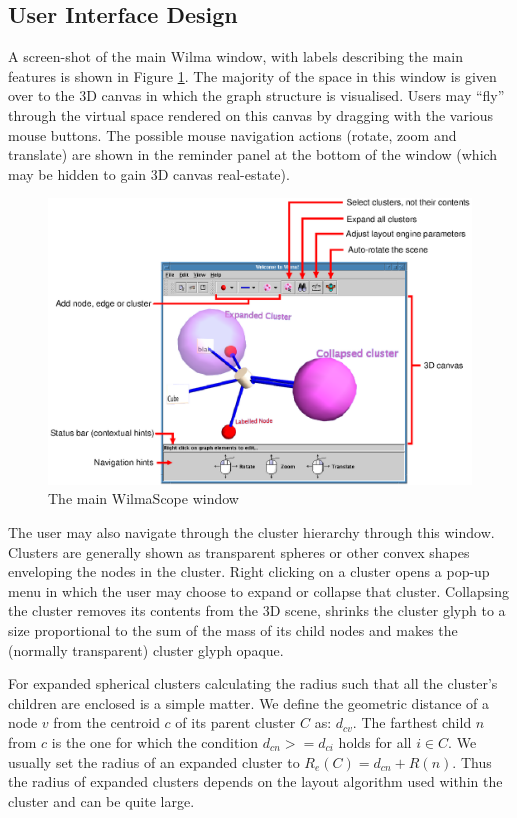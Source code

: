 \documentclass[runningheads]{cl2emult}
\begin{document}
\subsection{User Interface Design}
A screen-shot of the main Wilma window, with labels describing the main
features is shown in Figure \ref{fig-controls}.
The majority of the space in this window is given over to the 3D
canvas in which the graph structure is visualised.  Users may ``fly''
through the virtual space rendered on this canvas by dragging with the
various mouse buttons.  The possible mouse navigation actions (rotate,
zoom and translate) are
shown in the reminder panel at the bottom of the window (which may be
hidden to gain 3D canvas real-estate).
\begin{figure}[h]
  \centering
    \label{fig-controls}
    \includegraphics[width=\textwidth]{figures/wilmacontrols.eps}
    \caption{The main WilmaScope window}
\end{figure}

The user may also navigate through the cluster hierarchy through this
window.  Clusters are generally shown as transparent spheres or other
convex shapes enveloping the nodes in the cluster.  Right clicking on a
cluster opens a pop-up menu in which the user may choose to expand or
collapse that cluster.  Collapsing the cluster removes its contents
from the 3D scene, shrinks the cluster glyph to a
size proportional to the sum of the mass of its child nodes
and makes the (normally transparent) cluster glyph opaque.

For expanded spherical clusters calculating the radius such that all the
cluster's children are enclosed is a simple matter.
We define the geometric distance of a node $v$ from the centroid
$c$ of its parent cluster $C$ as: $d_{cv}$.  The farthest child $n$ from
$c$ is the one for which the condition $d_{cn} >= d_{ci}$ holds for
all $i \in C$.  We usually set the radius of an expanded cluster to
${R_e}(C) = d_{cn} + R(n)$.  Thus the radius of expanded clusters
depends on the layout algorithm used within the cluster and can be
quite large.
\end{document}
